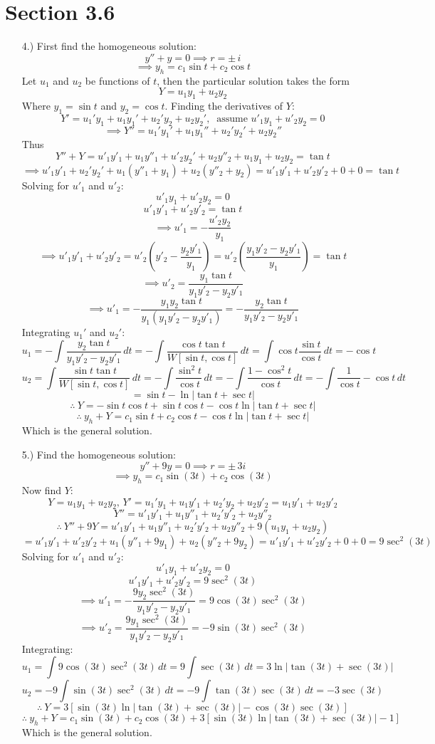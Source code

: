 \documentclass[12pt]{article}
\newcommand{\vertb}[1]{\left\vert#1\right\vert}
\newcommand{\bracks}[1]{\left[#1\right]}
\newcommand{\parns}[1]{\left(#1\right)}
\begin{document}
\pagestyle{fancy}
\fancyhead{}

\normalsize
\section*{Section 3.6}
\begin{itemize}
    \item [4.)] First find the homogeneous solution:
    \[y''+y=0\implies r=\pm\,i\]
    \[\implies y_h=c_1\sin t+c_2\cos t\]
    Let $u_1$ and $u_2$ be functions of $t$, then the particular solution takes the form
    \[Y=u_1y_1+u_2y_2\]
    Where $y_1=\sin t$ and $y_2=\cos t$. Finding the derivatives of $Y$:
    \[Y'=u_1'y_1+u_1y_1'+u_2'y_2+u_2y_2',\ \text{ assume }u'_1y_1+u'_2y_2=0\]
    \[\implies Y''=u_1'y_1'+u_1y_1''+u_2'y_2'+u_2y_2''\]
    Thus
    \[Y''+Y=u'_1y'_1+u_1y''_1+u'_2y_2'+u_2y''_2+u_1y_1+u_2y_2=\tan t\]
    \[\implies u'_1y'_1+u_2'y_2'+u_1(y''_1+y_1)+u_2(y''_2+y_2)=u'_1y'_1+u'_2y'_2+0+0=\tan t\]
    Solving for $u'_1$ and $u'_2$:
    \[u'_1y_1+u'_2y_2=0\]
    \[u'_1y'_1+u'_2y'_2=\tan t\]
    \[\implies u'_1=-\frac{u'_2y_2}{y_1}\]
    \[\implies u'_1y'_1+u'_2y'_2=u'_2\parns{y'_2-\frac{y_2y'_1}{y_1}}=u'_2\parns{\frac{y_1y'_2-y_2y'_1}{y_1}}=\tan t\]
    \[\implies u'_2=\frac{y_1\tan t}{y_1y'_2-y_2y'_1}\]
    \[\implies u'_1=-\frac{y_1y_2\tan t}{y_1(y_1y'_2-y_2y'_1)}=-\frac{y_2\tan t}{y_1y'_2-y_2y'_1}\]
    Integrating $u_1'$ and $u_2'$:
    \[u_1=-\int\frac{y_2\tan t}{y_1y'_2-y_2y'_1}\,dt=-\int\frac{\cos t\tan t}{W[\sin t,\cos t]}\,dt=\int\cos t\frac{\sin t}{\cos t}\,dt=-\cos t\]
    \[u_2=\int\frac{\sin t\tan t}{W[\sin t,\cos t]}\,dt=-\int\frac{\sin^2t}{\cos t}\,dt=-\int\frac{1-\cos^2t}{\cos t}\,dt=-\int\frac{1}{\cos t}-\cos t\,dt\]
    \[=\sin t-\ln\vertb{\tan t+\sec t}\]
    \[\therefore\ Y=-\sin t\cos t+\sin t\cos t-\cos t\ln\vertb{\tan t+\sec t}\]
    \[\therefore\ y_h+Y=c_1\sin t+c_2\cos t-\cos t\ln\vertb{\tan t+\sec t}\]
    Which is the general solution.

    \item [5.)] Find the homogeneous solution:
    \[y''+9y=0\implies r=\pm\,3i\]
    \[\implies y_h=c_1\sin(3t)+c_2\cos(3t)\]
    Now find $Y$:
    \[Y=u_1y_1+u_2y_2,\,Y'=u_1'y_1+u_1y'_1+u_2'y_2+u_2y'_2=u_1y'_1+u_2y'_2\]
    \[Y''=u'_1y'_1+u_1y''_1+u_2'y'_2+u_2y''_2\]
    \[\therefore\ Y''+9Y=u'_1y'_1+u_1y''_1+u_2'y'_2+u_2y''_2+9(u_1y_1+u_2y_2)\]
    \[=u'_1y'_1+u'_2y'_2+u_1(y''_1+9y_1)+u_2(y''_2+9y_2)=u'_1y'_1+u'_2y'_2+0+0=9\sec^2(3t)\]
    Solving for $u'_1$ and $u'_2$:
    \[u'_1y_1+u'_2y_2=0\]
    \[u'_1y'_1+u'_2y'_2=9\sec^2(3t)\]
    \[\implies u'_1=-\frac{9y_2\sec^2(3t)}{y_1y'_2-y_2y'_1}=9\cos(3t)\sec^2(3t)\]
    \[\implies u'_2=\frac{9y_1\sec^2(3t)}{y_1y'_2-y_2y'_1}=-9\sin(3t)\sec^2(3t)\]
    Integrating:
    \[u_1=\int9\cos(3t)\sec^2(3t)\,dt=9\int\sec(3t)\,dt=3\ln\vertb{\tan(3t)+\sec(3t)}\]
    \[u_2=-9\int\sin(3t)\sec^2(3t)\,dt=-9\int\tan(3t)\sec(3t)\,dt=-3\sec(3t)\]
    \[\therefore\ Y=3\bracks{\sin(3t)\ln\vertb{\tan(3t)+\sec(3t)}-\cos(3t)\sec(3t)}\]
    \[\therefore\ y_h+Y=c_1\sin(3t)+c_2\cos(3t)+3\bracks{\sin(3t)\ln\vertb{\tan(3t)+\sec(3t)}-1}\]
    Which is the general solution.


\end{itemize}
\end{document}
